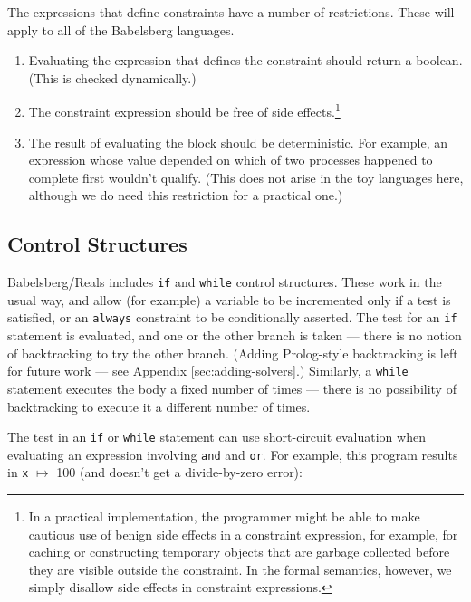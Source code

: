 \documentclass{article}
\begin{document}
The expressions that define constraints have a number of restrictions.
These will apply to all of the Babelsberg languages.

\begin{enumerate}

\item \label{item:constraint-type} Evaluating the expression that
  defines the constraint should return a boolean.  (This is checked
  dynamically.) 

\item \label{item:side-effects} The constraint expression should be
  free of side
  effects.\footnote{\label{footnote:benign-side-effects}In a practical
    implementation, the programmer might be able to make cautious use of
    benign side effects in a constraint expression, for example, for
    caching or constructing temporary objects that are garbage
    collected before they are visible outside the constraint.  In the
    formal semantics, however, we simply disallow side effects in
    constraint expressions.}

\item The result of evaluating the block
  should be deterministic.  For example, an expression whose value
  depended on which of two processes happened to complete first
  wouldn't qualify.  (This does not arise in the toy languages here,
  although we do need this restriction for a practical one.)

\end{enumerate}

\subsection{Control Structures}

Babelsberg/Reals includes \verb|if| and \verb|while| control
structures.  These work in the usual way, and allow (for example) a
variable to be incremented only if a test is satisfied, or an
\verb|always| constraint to be conditionally asserted.  The test for
an \verb|if| statement is evaluated, and one or the other branch is
taken --- there is no notion of backtracking to try the other branch.
(Adding Prolog-style backtracking is left for future work --- see
Appendix \ref{sec:adding-solvers}.)  Similarly, a \verb|while|
statement executes the body a fixed number of times --- there is no
possibility of backtracking to execute it a different number of times.

The test in an \verb|if| or \verb|while| statement can use
short-circuit evaluation when evaluating an expression involving
\verb|and| and \verb|or|.  For example, this program  results in
\verb|x| $\mapsto$ 100 (and doesn't get a divide-by-zero error):
\end{document}
